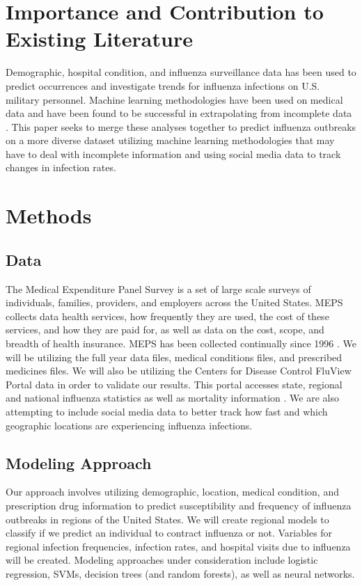 \documentclass[twoside,11pt]{article}
\begin{document}
\section{Importance and Contribution to Existing Literature}
Demographic, hospital condition, and influenza surveillance data has been used
to predict occurrences and investigate trends for influenza infections on U.S.
military personnel. \citep{buczak_2016}  Machine learning methodologies have been used on medical
data and have been found to be successful in extrapolating from incomplete data \citep{chen_2017, santillana_2016}.
This paper seeks to merge these analyses together to predict influenza outbreaks
on a more diverse dataset utilizing machine learning methodologies that may have
to deal with incomplete information and using social media data to track changes
in infection rates.
\section{Methods}
\subsection{Data}
The Medical Expenditure Panel Survey is a set of large scale surveys of
individuals, families, providers, and employers across the United States.  MEPS
collects data health services, how frequently they are used, the cost of these
services, and how they are paid for, as well as data on the cost, scope, and
breadth of health insurance.  MEPS has been collected continually since 1996 \citep{meps}.
We will be utilizing the full year data files, medical conditions files, and
prescribed medicines files.  We will also be utilizing the Centers for Disease
Control FluView Portal data in order to validate our results.  This portal
accesses state, regional and national influenza statistics as well as mortality
information \citep{cdc_interactive}. We are also attempting to include social media data to better
track how fast and which geographic locations are experiencing influenza
infections.
\subsection{Modeling Approach}
Our approach involves utilizing demographic, location, medical condition, and
prescription drug information to predict susceptibility and frequency of
influenza outbreaks in regions of the United States.  We will create regional
models to classify if we predict an individual to contract influenza or not.
Variables for regional infection frequencies, infection rates, and hospital
visits due to influenza will be created.  Modeling approaches under
consideration include logistic regression, SVMs, decision trees (and random
forests), as well as neural networks.
\end{document}
